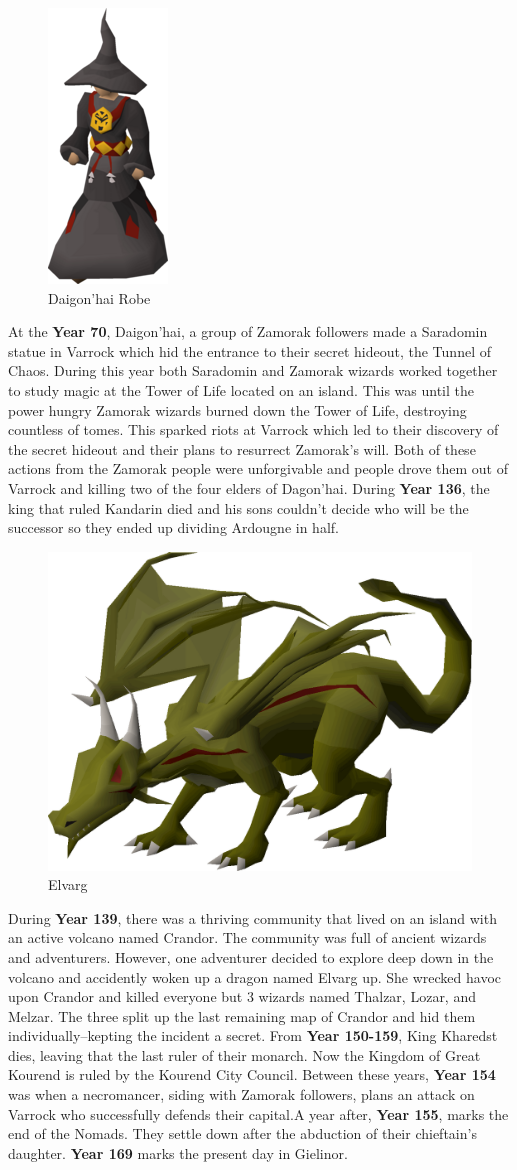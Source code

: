 \documentclass{article}
\begin{document}
\begin{figure}
\includegraphics[width=.12\textwidth]{dai.png}
\caption*{\label{fig:dai}Daigon'hai Robe}
\end{figure}
At the \textbf{Year 70}, Daigon'hai, a group of Zamorak followers made a Saradomin statue in Varrock which hid the entrance to their secret hideout, the Tunnel of Chaos. During this year both Saradomin and Zamorak wizards worked together to study magic at the Tower of Life located on an island. This was until the power hungry Zamorak wizards burned down the Tower of Life, destroying countless of tomes. This sparked riots at Varrock which led to their discovery of the secret hideout and their plans to resurrect Zamorak's will. Both of these actions from the Zamorak people were unforgivable and people drove them out of Varrock and killing two of the four elders of Dagon'hai. During \textbf{Year 136}, the king that ruled Kandarin died and his sons couldn't decide who will be the successor so they ended up dividing Ardougne in half.
\begin{figure}
\includegraphics[width=.25\textwidth]{Elvarg.png}
\caption*{\label{fig:drag}Elvarg}
\end{figure} 
During \textbf{Year 139}, there was a thriving community that lived on an island with an active volcano named Crandor. The community was full of ancient wizards and adventurers. However, one adventurer decided to explore deep down in the volcano and accidently woken up a dragon named Elvarg up. She wrecked havoc upon Crandor and killed everyone but 3 wizards named Thalzar, Lozar, and Melzar. The three split up the last remaining map of Crandor and hid them individually--kepting the incident a secret. From \textbf{Year 150-159}, King Kharedst dies, leaving that the last ruler of their monarch. Now the Kingdom of Great Kourend is ruled by the Kourend City Council. Between these years, \textbf{Year 154} was when a necromancer, siding with Zamorak followers, plans an attack on Varrock who successfully defends their capital.A year after, \textbf{Year 155}, marks the end of the Nomads. They settle down after the abduction of their chieftain's daughter. \textbf{Year 169} marks the present day in Gielinor. 
\newpage
\end{document}
